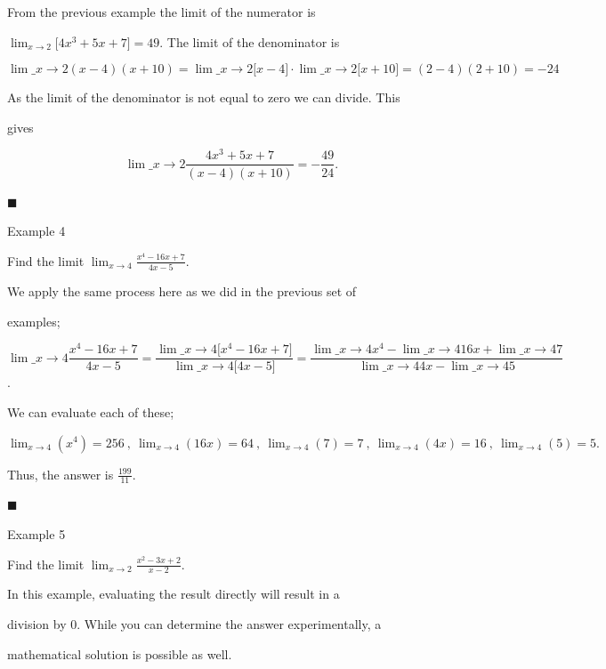 From the previous example the limit of the numerator is

$\lim_{x\to 2}\Big[4x^3+5x+7\Big]=49$. The limit of the denominator is



$$\lim\_{x\to2}(x-4)(x+10)=\lim\_{x\to2}\big[x-4\big]\cdot\lim\_{x\to2}\big[x+10\big]=(2-4)(2+10)=-24$$

As the limit of the denominator is not equal to zero we can divide. This

gives



$$\lim\_{x\to2}\frac{4x^3+5x+7}{(x-4)(x+10)}=-\frac{49}{24}.$$



$\blacksquare$



Example 4



Find the limit $\lim_{x\to4}\frac{x^4-16x+7}{4x-5}$.



We apply the same process here as we did in the previous set of

examples;



$$\lim\_{x\to4}\frac{x^4-16x+7}{4x-5}=\frac{\lim\limits\_{x\to4}\Big[x^4-16x+7\Big]}{\lim\limits\_{x\to4}\Big[4x-5\Big]}=\frac{\lim\limits\_{x\to4}x^4-\lim\limits\_{x\to4}16x+\lim\limits\_{x\to4}7}{\lim\limits\_{x\to4}4x-\lim\limits\_{x\to4}5}$$.



We can evaluate each of these;

$\lim_{x\to4}(x^4)=256\ ,\ \lim_{x\to4}(16x)=64\ ,\ \lim_{x\to4}(7)=7\ ,\ \lim_{x\to4}(4x)=16\ ,\ \lim_{x\to4}(5)=5.$

Thus, the answer is $\frac{199}{11}.$



$\blacksquare$



Example 5



Find the limit $\lim_{x\to2}\frac{x^2-3x+2}{x-2}$.



In this example, evaluating the result directly will result in a

division by 0. While you can determine the answer experimentally, a

mathematical solution is possible as well.



